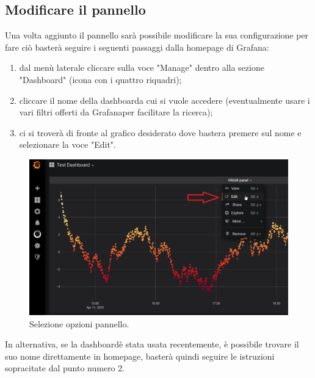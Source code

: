     \subsection{Modificare il pannello}
        Una volta aggiunto il pannello sarà possibile modificare la sua configurazione per fare ciò basterà seguire i seguenti passaggi dalla homepage di Grafana\glo:
        \begin{enumerate}
            \item dal menù laterale cliccare sulla voce "Manage" dentro alla sezione "Dashboard" (icona con i quattro riquadri);
            \item cliccare il nome della dashboard\glosp a cui si vuole accedere (eventualmente usare i vari filtri offerti da Grafana\glosp per facilitare la ricerca);
            \item ci si troverà di fronte al grafico desiderato dove bastera premere sul nome e selezionare la voce "Edit".
        \end{enumerate}
        \begin{figure}[H]
            \includegraphics[width=\textwidth,height=\textheight,keepaspectratio]{img/modificare_pannello.png}
            \caption{Selezione opzioni pannello.}
        \end{figure}
        In alternativa, se la dashboard\glosp è stata usata recentemente, è possibile trovare il suo nome direttamente in homepage, basterà quindi seguire le istruzioni sopracitate dal punto numero 2.
